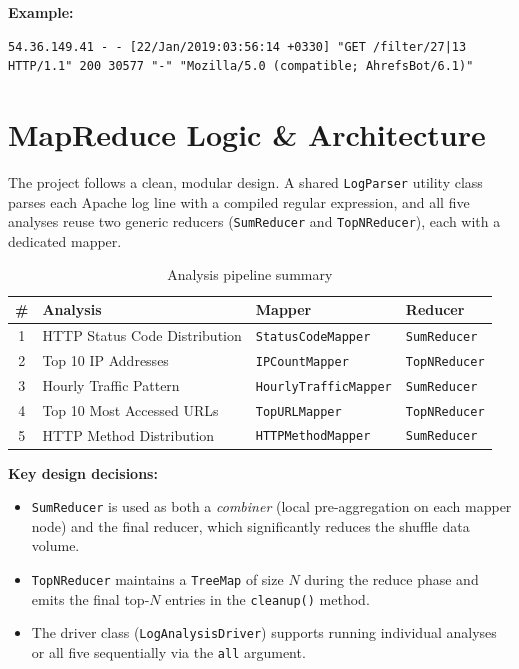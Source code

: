 \documentclass[12pt,a4paper]{article}
\begin{document}
\textbf{Example:}
\begin{lstlisting}
54.36.149.41 - - [22/Jan/2019:03:56:14 +0330] "GET /filter/27|13 HTTP/1.1" 200 30577 "-" "Mozilla/5.0 (compatible; AhrefsBot/6.1)"
\end{lstlisting}

\section{MapReduce Logic \& Architecture}

The project follows a clean, modular design. A shared \texttt{LogParser} utility class parses each Apache log line with a compiled regular expression, and all five analyses reuse two generic reducers (\texttt{SumReducer} and \texttt{TopNReducer}), each with a dedicated mapper.

\begin{table}[H]
\centering
\caption{Analysis pipeline summary}
\footnotesize
\begin{tabular}{@{}clll@{}}
\hline
\textbf{\#} & \textbf{Analysis} & \textbf{Mapper} & \textbf{Reducer} \\ \hline
1 & HTTP Status Code Distribution & \texttt{StatusCodeMapper}    & \texttt{SumReducer}  \\
2 & Top 10 IP Addresses           & \texttt{IPCountMapper}       & \texttt{TopNReducer} \\
3 & Hourly Traffic Pattern         & \texttt{HourlyTrafficMapper} & \texttt{SumReducer}  \\
4 & Top 10 Most Accessed URLs      & \texttt{TopURLMapper}        & \texttt{TopNReducer} \\
5 & HTTP Method Distribution       & \texttt{HTTPMethodMapper}    & \texttt{SumReducer}  \\
\hline
\end{tabular}
\end{table}

\textbf{Key design decisions:}
\begin{itemize}
    \item \texttt{SumReducer} is used as both a \textit{combiner} (local pre-aggregation on each mapper node) and the final reducer, which significantly reduces the shuffle data volume.
    \item \texttt{TopNReducer} maintains a \texttt{TreeMap} of size $N$ during the reduce phase and emits the final top-$N$ entries in the \texttt{cleanup()} method.
    \item The driver class (\texttt{LogAnalysisDriver}) supports running individual analyses or all five sequentially via the \texttt{all} argument.
\end{itemize}
\end{document}
